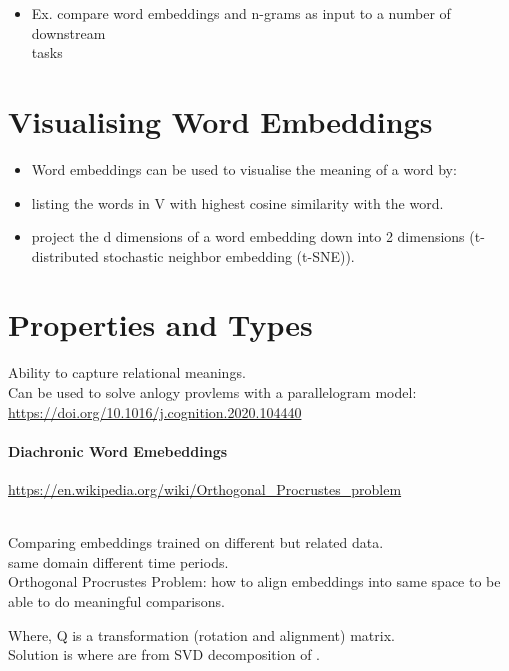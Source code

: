 \documentclass[
]{article}
\providecommand{\tightlist}{%
  \setlength{\itemsep}{0pt}\setlength{\parskip}{0pt}}
\begin{document}
\begin{itemize}
\tightlist
\item
  Ex. compare word embeddings and n-grams as input to a number of
  downstream\\
  tasks
\end{itemize}

\hypertarget{visualising-word-embeddings}{%
\section{Visualising Word
Embeddings}\label{visualising-word-embeddings}}

\begin{itemize}
\tightlist
\item
  Word embeddings can be used to visualise the meaning of a word by:
\item
  listing the words in V with highest cosine similarity with the word.
\item
  project the d dimensions of a word embedding down into 2 dimensions
  (t-distributed stochastic neighbor embedding (t-SNE)).
\end{itemize}

\hypertarget{properties-and-types}{%
\section{Properties and Types}\label{properties-and-types}}

Ability to capture relational meanings.\\
Can be used to solve anlogy provlems with a parallelogram model:\\
\url{https://doi.org/10.1016/j.cognition.2020.104440}

\hypertarget{diachronic-word-emebeddings}{%
\paragraph{Diachronic Word
Emebeddings}\label{diachronic-word-emebeddings}}

\url{https://en.wikipedia.org/wiki/Orthogonal_Procrustes_problem}\strut \\
Comparing embeddings trained on different but related data.\\
same domain different time periods.\\
Orthogonal Procrustes Problem: how to align embeddings into same space
to be able to do meaningful comparisons.

{}Where, Q is a transformation (rotation and alignment) matrix.\\
Solution is {} where {} are from SVD decomposition of {}.
\end{document}
